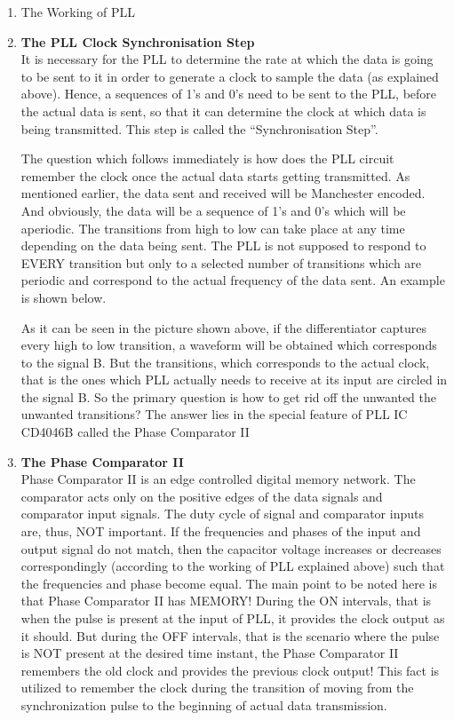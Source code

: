 \documentclass{article}
\begin{document}
\begin{enumerate}[label=(\Alph*)]
\item The Working of PLL
\item \textbf{The PLL Clock Synchronisation Step}\\
  It is necessary for the PLL to determine the rate at which the data is going to be sent to it in order to generate a clock to sample the data (as explained above). Hence, a sequences of 1’s and 0’s need to be sent to the PLL, before the actual data is sent, so that it can determine the clock at which data is being transmitted. This step is called the “Synchronisation Step”. 

The question which follows immediately is how does the PLL circuit remember the clock once the actual data starts getting transmitted. As mentioned earlier, the data sent and received will be Manchester encoded. And obviously, the data will be a sequence of 1’s and 0’s which will be aperiodic. The transitions from high to low can take place at any time depending on the data being sent. The PLL is not supposed to respond to EVERY transition but only to a selected number of transitions which are periodic and correspond to the actual frequency of the data sent. An example is shown below.


As it can be seen in the picture shown above, if the differentiator captures every high to low transition, a waveform will be obtained which corresponds to the signal B. But the transitions, which corresponds to the actual clock, that is the ones which PLL actually needs to receive at its input are circled in the signal B. So the primary question is how to get rid off the unwanted the unwanted transitions?  
The answer lies in the special feature of PLL IC CD4046B called the Phase Comparator II

\item \textbf{The Phase Comparator II}\\
  Phase Comparator II is an edge controlled digital memory network. The comparator acts only on the positive edges of the data signals and comparator input signals. The duty cycle of signal and comparator inputs are, thus, NOT important. If the frequencies and phases of the input and output signal do not match, then the capacitor voltage increases or decreases correspondingly (according to the working of PLL explained above) such that the frequencies and phase become equal. The main point to be noted here is that Phase Comparator II has MEMORY! During the ON intervals, that is when the pulse is present at the input of PLL, it provides the clock output as it should. But during the OFF intervals, that is the scenario where the pulse is NOT present at the desired time instant, the Phase Comparator II remembers the old clock and provides the previous clock output! This fact is utilized to remember the clock during the transition of moving from the synchronization pulse to the beginning of actual data transmission.


\end{enumerate}
\end{document}
